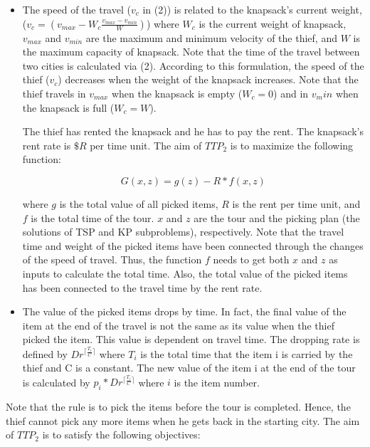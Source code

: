 \documentclass[twocolumn]{IEEEtran}
\begin{document}
\begin{itemize}
    \item The speed of the travel ($v_c$ in (2)) is related to the
    knapsack’s current weight, 
    ($v_c = (v_{max} - W_c \frac{v_{max}-v_{min}}{W})$)
    where $W_c$ is the current weight of knapsack, $v_{max}$ and $v_{min}$
    are the maximum and minimum velocity of the thief, and
    $W$ is the maximum capacity of knapsack. Note that the
    time of the travel between two cities is calculated via (2).
    According to this formulation, the speed of the thief ($v_c$)
    decreases when the weight of the knapsack increases. Note
    that the thief travels in $v_{max}$ when the knapsack is empty
    ($W_c=0$) and in $v_min$ when the knapsack is full ($W_c=W$).

    The thief has rented the knapsack and he has to pay the rent. 
    The knapsack’s rent rate is $\$R$ per time unit.
    The aim of $TTP_2$ is to maximize the following function:

    \begin{equation}
        G(x,z) = g(z) - R*f(x,z)
    \end{equation}

    where $g$ is the total value of all picked items, $R$ is the rent
    per time unit, and $f$ is the total time of the tour. $x$ and $z$ are the
    tour and the picking plan (the solutions of TSP and KP subproblems), respectively.
    Note that the travel time and weight of the picked items have been connected through the changes
    of the speed of travel. Thus, the function $f$ needs to get both $x$
    and $z$ as inputs to calculate the total time. Also, the total value
    of the picked items has been connected to the travel time by
    the rent rate.

    \item The value of the picked items drops by time.
    In fact, the final value of the item at the end of the travel is not the
    same as its value when the thief picked the item. This
    value is dependent on travel time. The dropping rate is
    defined by $Dr^{\lceil \frac{T_i}{C} \rceil}$ where $T_i$ is the total time that the item i
    is carried by the thief and C is a constant. The new value
    of the item i at the end of the tour is calculated by 
    $p_i*Dr^{\lceil \frac{T_i}{C} \rceil}$ where $i$ is the item number. \\
\end{itemize}

Note that the rule is to pick the items before the tour is
completed. Hence, the thief cannot pick any more items when
he gets back in the starting city. The aim of $TTP_2$ is to satisfy
the following objectives:
\end{document}
